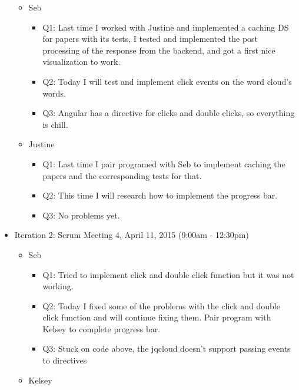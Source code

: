 \documentclass[]{article}
\begin{document}
\begin{itemize}
  \begin{itemize}
  \itemsep1pt\parskip0pt
  \item
    Seb

    \begin{itemize}
    \itemsep1pt\parskip0pt
    \item
      Q1: Last time I worked with Justine and implemented a caching DS
      for papers with its tests, I tested and implemented the post
      processing of the response from the backend, and got a first nice
      visualization to work.
    \item
      Q2: Today I will test and implement click events on the word
      cloud's words.
    \item
      Q3: Angular has a directive for clicks and double clicks, so
      everything is chill.
    \end{itemize}
  \item
    Justine

    \begin{itemize}
    \itemsep1pt\parskip0pt
    \item
      Q1: Last time I pair programed with Seb to implement caching the
      papers and the corresponding tests for that.
    \item
      Q2: This time I will research how to implement the progress bar.
    \item
      Q3: No problems yet.
    \end{itemize}
  \end{itemize}
\item
  Iteration 2: Scrum Meeting 4, April 11, 2015 (9:00am - 12:30pm)

  \begin{itemize}
  \itemsep1pt\parskip0pt
  \item
    Seb

    \begin{itemize}
    \itemsep1pt\parskip0pt
    \item
      Q1: Tried to implement click and double click function but it was
      not working.
    \item
      Q2: Today I fixed some of the problems with the click and double
      click function and will continue fixing them. Pair program with
      Kelsey to complete progress bar.
    \item
      Q3: Stuck on code above, the jqcloud doesn't support passing
      events to directives
    \end{itemize}
  \item
    Kelsey


\end{itemize}
\end{itemize}
\end{document}
